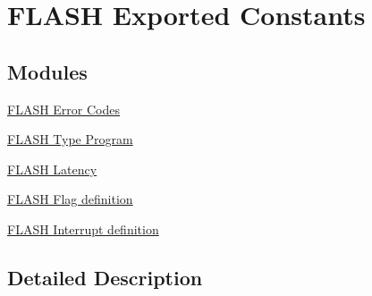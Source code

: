 \hypertarget{group___f_l_a_s_h___exported___constants}{}\section{F\+L\+A\+SH Exported Constants}
\label{group___f_l_a_s_h___exported___constants}
\subsection*{Modules}
\begin{DoxyCompactItemize}
\item 
\hyperlink{group___f_l_a_s_h___error___codes}{F\+L\+A\+S\+H Error Codes}
\item 
\hyperlink{group___f_l_a_s_h___type___program}{F\+L\+A\+S\+H Type Program}
\item 
\hyperlink{group___f_l_a_s_h___latency}{F\+L\+A\+S\+H Latency}
\item 
\hyperlink{group___f_l_a_s_h___flag__definition}{F\+L\+A\+S\+H Flag definition}
\item 
\hyperlink{group___f_l_a_s_h___interrupt__definition}{F\+L\+A\+S\+H Interrupt definition}
\end{DoxyCompactItemize}


\subsection{Detailed Description}

